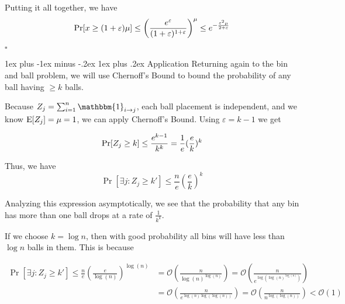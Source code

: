 \documentclass[11pt]{article}
\makeatletter
\renewcommand{\subsubsection}{\@startsection{subsubsection}{3}{0mm}%
                                   {1ex plus -1ex minus -.2ex}%
                                   {1ex plus .2ex}%
                                   {\normalfont\normalsize\bfseries}}
\newcommand{\pr}{{\bf {\rm Pr}}}
\newcommand{\expc}{{\bf {\rm E}}}
\newcommand*{\QEDB}{\null\nobreak\hfill\ensuremath{\square}}
\newcommand{\bigo}{\mathcal{O}}
\makeatother
\begin{document}
Putting it all together, we have 
\[ \pr[x \geq (1+\varepsilon)\mu] \leq \left(\frac{e^\varepsilon}{(1+\varepsilon)^{1+\varepsilon}}\right)^\mu \leq e^{-\frac{\varepsilon^2 \mu}{2+\varepsilon}} \]

\QEDB

\subsubsection{Application}
\label{sec:ChernoffApp}
Returning again to the bin and ball problem, we will use Chernoff's Bound to bound the probability of any ball having $\geq k$ balls.

Because $Z_j = \sum_{i=1}^{n} \mathbbm{1}_{i \rightarrow j}$, each ball placement is independent, and we know $\expc[Z_j] = \mu = 1$, we can apply Chernoff's Bound. Using $\varepsilon = k-1$ we get

\[ \pr[Z_j \geq k] \leq  \frac{e^{k-1}}{k^k} = \frac{1}{e} (\frac{e}{k})^k \]

Thus, we have 
\[ \Pr [\exists j: Z_j \geq k'] \leq \frac{n}{e} (\frac{e}{k})^k \]

Analyzing this expression asymptotically, we see that the probability that any bin has more than one ball drops at a rate of $\frac{1}{k^k}$. 

If we choose $k= \log n$, then with good probability all bins will have less than $\log n$ balls in them. This is because 

\begin{align*}
 \Pr [\exists j: Z_j \geq k'] \leq \frac{n}{e} \left(\frac{e}{\log(n)}\right)^{\log(n)} &= \bigo(\frac{n}{\log(n)^{\log(n)}}) = \bigo(\frac{n}{e^{\log\left(\log(n)^{\log(n)}\right)}}) \\
&= \bigo(\frac{n}{e^{\log(n)\log(\log(n))}}) = \bigo(\frac{n}{n^{\log(\log(n))}}) < \bigo(1)
\end{align*}
\end{document}
